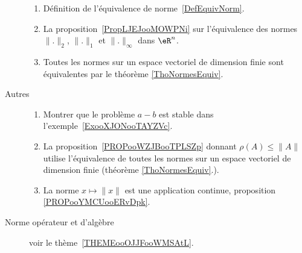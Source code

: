 \begin{description}
	      \begin{enumerate}
		      \item
		            Définition de l'équivalence de norme~\ref{DefEquivNorm}.
		      \item
		            La proposition~\ref{PropLJEJooMOWPNi} sur l'équivalence des normes \( \| . \|_2\), \( \| . \|_1\) et \( \| . \|_{\infty}\)  dans \( \eR^n\).
		      \item
		            Toutes les normes sur un espace vectoriel de dimension finie sont équivalentes par le théorème \ref{ThoNormesEquiv}.
	      \end{enumerate}
	\item[Autres]
	      \begin{enumerate}
		      \item
		            Montrer que le problème \( a-b\) est stable dans l'exemple~\ref{ExooXJONooTAYZVc}.
		      \item
		            La proposition~\ref{PROPooWZJBooTPLSZp} donnant \( \rho(A)\leq \| A \|\) utilise l'équivalence de toutes les normes sur un espace vectoriel de dimension finie (théorème \ref{ThoNormesEquiv}.).
		      \item
		            La norme \( x\mapsto \| x \|\) est une application continue, proposition \ref{PROPooYMCUooERvDpk}.
	      \end{enumerate}
	\item[Norme opérateur et d'algèbre] voir le thème~\ref{THEMEooOJJFooWMSAtL}.

\end{description}

